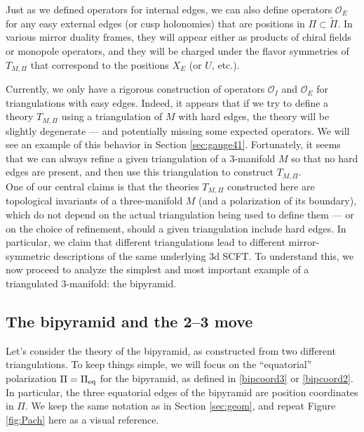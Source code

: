 \documentclass[hyper,letterpaper]{JHEP3}
\numberwithin{equation}{section}
\newcommand{\CO}{\mathcal{O}}
\begin{document}
Just as we defined operators for internal edges, we can also define operators $\CO_E$ for any easy external edges (or cusp holonomies) that are positions in $\Pi\subset\tilde\Pi$. In various mirror duality frames, they will appear either as products of chiral fields or monopole operators, and they will be charged under the flavor symmetries of $T_{M,\Pi}$ that correspond to the positions $X_E$ (or $U$, etc.).

Currently, we only have a rigorous construction of operators $\CO_I$ and $\CO_E$ for triangulations with easy edges. Indeed, it appears that if we try to define a theory $T_{M,\Pi}$ using a triangulation of $M$ with hard edges, the theory will be slightly degenerate --- and potentially missing some expected operators. We will see an example of this behavior in Section \ref{sec:gauge41}. Fortunately, it seems that we can always refine a given triangulation of a 3-manifold $M$ so that no hard edges are present, and then use this triangulation to construct $T_{M,\Pi}$. \\



One of our central claims is that the theories $T_{M,\Pi}$ constructed here are topological invariants of a three-manifold $M$ (and a polarization of its boundary), which do not depend on the actual triangulation being used to define them --- or on the choice of refinement, should a given triangulation include hard edges. In particular, we claim that different triangulations lead to different mirror-symmetric descriptions of the same underlying 3d SCFT. To understand this, we now proceed to analyze the simplest and most important example of a triangulated 3-manifold: the bipyramid.



\subsection{The bipyramid and the 2--3 move}
\label{sec:gauge23}


Let's consider the theory of the bipyramid, as constructed from two different triangulations. To keep things simple, we will focus on the ``equatorial'' polarization $\Pi=\Pi_{\rm eq}$ for the bipyramid, as defined in \eqref{bipcoord3} or \eqref{bipcoord2}. In particular, the three equatorial edges of the bipyramid are position coordinates in $\Pi$. We keep the same notation as in Section \ref{sec:geom}, and repeat Figure \ref{fig:Pach} here as a visual reference.
\end{document}
